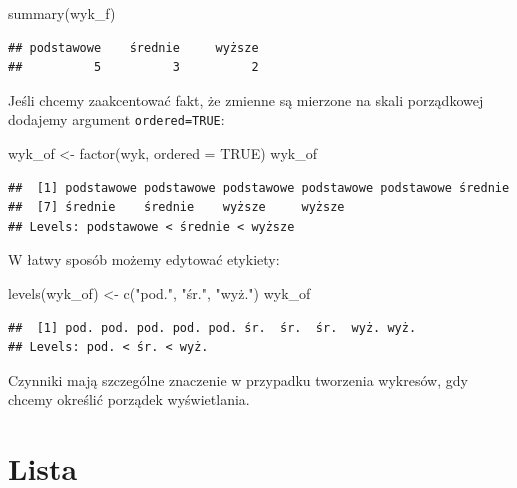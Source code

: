 \documentclass[
]{book}
\newenvironment{Shaded}{\begin{snugshade}}{\end{snugshade}}
\newcommand{\AttributeTok}[1]{\textcolor[rgb]{0.77,0.63,0.00}{#1}}
\newcommand{\ConstantTok}[1]{\textcolor[rgb]{0.00,0.00,0.00}{#1}}
\newcommand{\FunctionTok}[1]{\textcolor[rgb]{0.00,0.00,0.00}{#1}}
\newcommand{\NormalTok}[1]{#1}
\newcommand{\OtherTok}[1]{\textcolor[rgb]{0.56,0.35,0.01}{#1}}
\newcommand{\StringTok}[1]{\textcolor[rgb]{0.31,0.60,0.02}{#1}}
\begin{document}
\begin{Shaded}
\begin{Highlighting}[]
\FunctionTok{summary}\NormalTok{(wyk\_f)}
\end{Highlighting}
\end{Shaded}

\begin{verbatim}
## podstawowe    średnie     wyższe 
##          5          3          2
\end{verbatim}

Jeśli chcemy zaakcentować fakt, że zmienne są mierzone na skali porządkowej dodajemy argument \texttt{ordered=TRUE}:

\begin{Shaded}
\begin{Highlighting}[]
\NormalTok{wyk\_of }\OtherTok{\textless{}{-}} \FunctionTok{factor}\NormalTok{(wyk, }\AttributeTok{ordered =} \ConstantTok{TRUE}\NormalTok{)}
\NormalTok{wyk\_of}
\end{Highlighting}
\end{Shaded}

\begin{verbatim}
##  [1] podstawowe podstawowe podstawowe podstawowe podstawowe średnie   
##  [7] średnie    średnie    wyższe     wyższe    
## Levels: podstawowe < średnie < wyższe
\end{verbatim}

W łatwy sposób możemy edytować etykiety:

\begin{Shaded}
\begin{Highlighting}[]
\FunctionTok{levels}\NormalTok{(wyk\_of) }\OtherTok{\textless{}{-}} \FunctionTok{c}\NormalTok{(}\StringTok{"pod."}\NormalTok{, }\StringTok{"śr."}\NormalTok{, }\StringTok{"wyż."}\NormalTok{)}
\NormalTok{wyk\_of}
\end{Highlighting}
\end{Shaded}

\begin{verbatim}
##  [1] pod. pod. pod. pod. pod. śr.  śr.  śr.  wyż. wyż.
## Levels: pod. < śr. < wyż.
\end{verbatim}

Czynniki mają szczególne znaczenie w przypadku tworzenia wykresów, gdy chcemy określić porządek wyświetlania.

\hypertarget{lista}{%
\section{Lista}\label{lista}}
\end{document}
